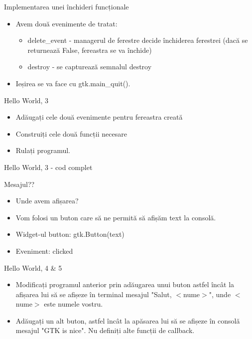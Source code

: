 \documentclass{beamer}
\begin{document}
\begin{frame}{Implementarea unei închideri funcționale}
\begin{itemize}
	\item Avem două evenimente de tratat:
		\begin{itemize}
			\item delete\_event - managerul de ferestre decide închiderea ferestrei (dacă se returnează False, fereastra se va închide)
			\item destroy - se capturează semnalul destroy
		\end{itemize}
	\item \pause Ieșirea se va face cu gtk.main\_quit().
\end{itemize}
\end{frame}

\begin{frame}{Hello World, 3}
\begin{itemize}
	\item Adăugați cele două evenimente pentru fereastra creată
	\item Construiți cele două funcții necesare
	\item Rulați programul.
\end{itemize}
\end{frame}

\begin{frame}{Hello World, 3 - cod complet}
	
\end{frame}
\begin{frame}{Mesajul??}
\begin{itemize}
	\item Unde avem afișarea?
	\item Vom folosi un buton care să ne permită să afișăm text la consolă.
	\item Widget-ul button: gtk.Button(text)
	\item Eveniment: clicked
\end{itemize}
\end{frame}

\begin{frame}{Hello World, 4 \& 5}
\begin{itemize}
	\item Modificați programul anterior prin adăugarea unui buton astfel încât la afișarea lui să se afișeze în terminal mesajul "Salut, $<$nume$>$", unde $<$nume$>$ este numele vostru.
	\item \pause Adăugați un alt buton, astfel încât la apăsarea lui să se afișeze în consolă mesajul "GTK is nice". Nu definiți alte funcții de callback.
\end{itemize}
\end{frame}
\end{document}
